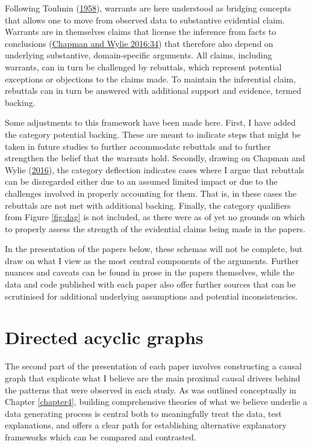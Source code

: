 \documentclass[
  12pt,
  a4paper,
  oneside]{book}
\begin{document}
Following Toulmin (\protect\hyperlink{ref-toulmin1958}{1958}), \textquotesingle warrants\textquotesingle{} are here understood as bridging concepts that allows one to move from observed data to substantive evidential claim. Warrants are in themselves claims that \textquotesingle license the inference from facts to conclusions\textquotesingle{} (\protect\hyperlink{ref-chapman2016}{Chapman and Wylie 2016:34}) that therefore also depend on underlying substantive, domain-specific arguments. All claims, including warrants, can in turn be challenged by \textquotesingle rebuttals\textquotesingle, which represent potential exceptions or objections to the claims made. To maintain the inferential claim, rebuttals can in turn be answered with additional support and evidence, termed \textquotesingle backing\textquotesingle.

Some adjustments to this framework have been made here. First, I have added the category \textquotesingle potential backing\textquotesingle. These are meant to indicate steps that might be taken in future studies to further accommodate rebuttals and to further strengthen the belief that the warrants hold. Secondly, drawing on Chapman and Wylie (\protect\hyperlink{ref-chapman2016}{2016}), the category \textquotesingle deflection\textquotesingle{} indicates cases where I argue that rebuttals can be disregarded either due to an assumed limited impact or due to the challenges involved in properly accounting for them. That is, in these cases the rebuttals are not met with additional backing. Finally, the category \textquotesingle qualifiers\textquotesingle{} from Figure \ref{fig:dag} is not included, as there were as of yet no grounds on which to properly assess the strength of the evidential claims being made in the papers.

In the presentation of the papers below, these schemas will not be complete, but draw on what I view as the most central components of the arguments. Further nuances and caveats can be found in prose in the papers themselves, while the data and code published with each paper also offer further sources that can be scrutinised for additional underlying assumptions and potential inconsistencies.

\hypertarget{directed-acyclic-graphs}{%
\section{Directed acyclic graphs}\label{directed-acyclic-graphs}}

The second part of the presentation of each paper involves constructing a causal graph that explicate what I believe are the main proximal causal drivers behind the patterns that were observed in each study. As was outlined conceptually in Chapter \ref{chapter4}, building comprehensive theories of what we believe underlie a data generating process is central both to meaningfully treat the data, test explanations, and offers a clear path for establishing alternative explanatory frameworks which can be compared and contrasted.
\end{document}
